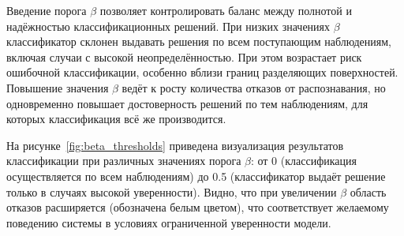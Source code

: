 Введение порога \(\beta\) позволяет контролировать баланс между полнотой и надёжностью классификационных решений. При низких значениях \(\beta\) классификатор склонен выдавать решения по всем поступающим наблюдениям, включая случаи с высокой неопределённостью. При этом возрастает риск ошибочной классификации, особенно вблизи границ разделяющих поверхностей. Повышение значения \(\beta\) ведёт к росту количества отказов от распознавания, но одновременно повышает достоверность решений по тем наблюдениям, для которых классификация всё же производится.

На рисунке~\cref{fig:beta_thresholds} приведена визуализация результатов классификации при различных значениях порога \(\beta\): от 0 (классификация осуществляется по всем наблюдениям) до 0.5 (классификатор выдаёт решение только в случаях высокой уверенности). Видно, что при увеличении \(\beta\) область отказов расширяется (обозначена белым цветом), что соответствует желаемому поведению системы в условиях ограниченной уверенности модели.

